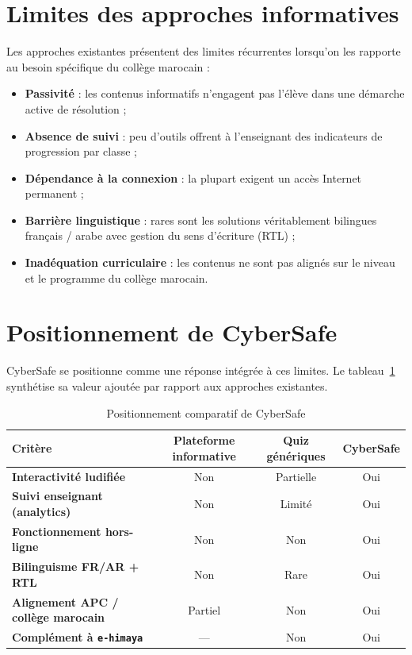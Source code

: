 \documentclass[12pt, a4paper, oneside]{report}
\begin{document}
\section{Limites des approches informatives}
Les approches existantes présentent des limites récurrentes lorsqu'on les rapporte au besoin spécifique du collège marocain :
\begin{itemize}[leftmargin=*]
  \item \textbf{Passivité} : les contenus informatifs n'engagent pas l'élève dans une démarche active de résolution ;
  \item \textbf{Absence de suivi} : peu d'outils offrent à l'enseignant des indicateurs de progression par classe ;
  \item \textbf{Dépendance à la connexion} : la plupart exigent un accès Internet permanent ;
  \item \textbf{Barrière linguistique} : rares sont les solutions véritablement bilingues français / arabe avec gestion du sens d'écriture (RTL) ;
  \item \textbf{Inadéquation curriculaire} : les contenus ne sont pas alignés sur le niveau et le programme du collège marocain.
\end{itemize}

\section{Positionnement de CyberSafe}
CyberSafe se positionne comme une réponse intégrée à ces limites. Le tableau~\ref{tab:positionnement} synthétise sa valeur ajoutée par rapport aux approches existantes.

\begin{table}[H]
\centering
\caption{Positionnement comparatif de CyberSafe}
\label{tab:positionnement}
\begin{tabularx}{\textwidth}{@{}>{\bfseries}l c c c@{}}
\toprule
Critère & Plateforme informative & Quiz génériques & CyberSafe \\
\midrule
Interactivité ludifiée & Non & Partielle & Oui \\
Suivi enseignant (analytics) & Non & Limité & Oui \\
Fonctionnement hors-ligne & Non & Non & Oui \\
Bilinguisme FR/AR + RTL & Non & Rare & Oui \\
Alignement APC / collège marocain & Partiel & Non & Oui \\
Complément à \texttt{e-himaya} & --- & Non & Oui \\
\bottomrule
\end{tabularx}
\end{table}
\end{document}
